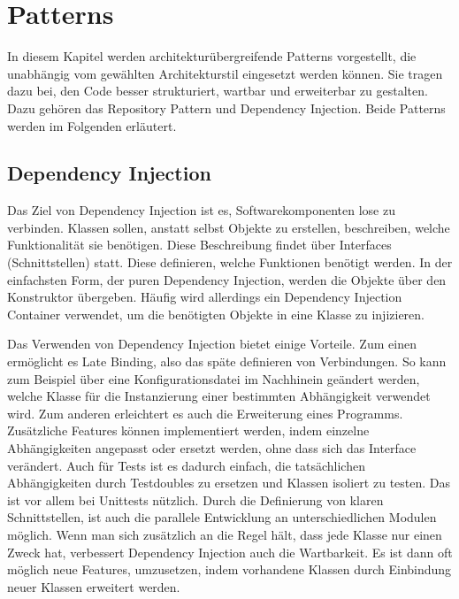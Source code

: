 \section{Patterns}
In diesem Kapitel werden architekturübergreifende Patterns vorgestellt, die unabhängig vom gewählten Architekturstil eingesetzt werden können. Sie tragen dazu bei, den Code besser strukturiert, wartbar und erweiterbar zu gestalten. Dazu gehören das Repository Pattern und Dependency Injection. Beide Patterns werden im Folgenden erläutert.

\subsection{Dependency Injection}
Das Ziel von Dependency Injection ist es, Softwarekomponenten lose zu verbinden. Klassen sollen, anstatt selbst Objekte zu erstellen, beschreiben, welche Funktionalität sie benötigen. Diese Beschreibung findet über Interfaces (Schnittstellen) statt. Diese definieren, welche Funktionen benötigt werden. In der einfachsten Form, der puren Dependency Injection, werden die Objekte über den Konstruktor übergeben. Häufig wird allerdings ein Dependency Injection Container verwendet, um die benötigten Objekte in eine Klasse zu injizieren.

Das Verwenden von Dependency Injection bietet einige Vorteile. Zum einen ermöglicht es Late Binding, also das späte definieren von Verbindungen. So kann zum Beispiel über eine Konfigurationsdatei im Nachhinein geändert werden, welche Klasse für die Instanzierung einer bestimmten Abhängigkeit verwendet wird. Zum anderen erleichtert es auch die Erweiterung eines Programms. Zusätzliche Features können implementiert werden, indem einzelne Abhängigkeiten angepasst oder ersetzt werden, ohne dass sich das Interface verändert. Auch für Tests ist es dadurch einfach, die tatsächlichen Abhängigkeiten durch Testdoubles zu ersetzen und Klassen isoliert zu testen. Das ist vor allem bei Unittests nützlich. Durch die Definierung von klaren Schnittstellen, ist auch die parallele Entwicklung an unterschiedlichen Modulen möglich. Wenn man sich zusätzlich an die Regel hält, dass jede Klasse nur einen Zweck hat, verbessert Dependency Injection auch die Wartbarkeit. Es ist dann oft möglich neue Features, umzusetzen, indem vorhandene Klassen durch Einbindung neuer Klassen erweitert werden.
\cite{seemann_dependency_2019}

